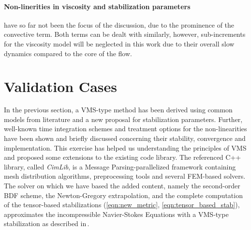\paragraph{Non-linerities in viscosity and stabilization parameters} have so far not been the focus of the discussion, due to the prominence of the convective term. Both terms can be dealt with similarly, however, sub-increments for the viscosity model will be neglected in this work due to their overall slow dynamics compared to the core of the flow.

\section{Validation Cases}
In the previous section, a VMS-type method has been derived using common models from literature and a new proposal for stabilization parameters. Further, well-known time integration schemes and treatment options for the non-linearities have been shown and briefly discussed concerning their stability, convergence and implementation. This exercise has helped us understanding the principles of VMS and proposed some extensions to the existing code library. The referenced C++ library, called \textit{CimLib}, is a Message Parsing-parallelized framework containing mesh distribution algorithms, preprocessing tools and several FEM-based solvers. The solver on which we have based the added content, namely the second-order BDF scheme, the Newton-Gregory extrapolation, and the complete computation of the tensor-based stabilizations (\autoref{eqn:new_metric}, \autoref{eqn:tensor_based_stab}), approximates the incompressible Navier-Stokes Equations with a VMS-type stabilization as described in\,\cite{Hachem2010, Coupez2013}.

